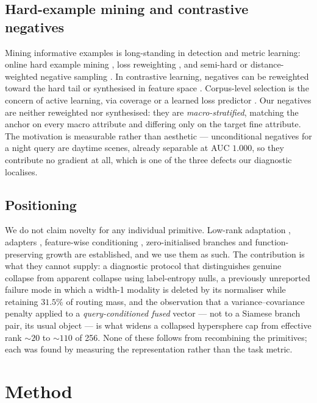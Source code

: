 \documentclass[10pt,twocolumn,letterpaper]{article}
\begin{document}
\subsection{Hard-example mining and contrastive negatives}
Mining informative examples is long-standing in detection and metric
learning: online hard example mining \cite{ohem}, loss reweighting
\cite{focal}, and semi-hard or distance-weighted negative sampling
\cite{facenet,samplingmatters}. In contrastive learning, negatives can be
reweighted toward the hard tail \cite{hardneg} or synthesised in feature
space \cite{mochi}. Corpus-level selection is the concern of active
learning, via coverage \cite{coreset} or a learned loss predictor \cite{learningloss}. Our
negatives are neither reweighted nor synthesised: they are
\emph{macro-stratified}, matching the anchor on every macro attribute and
differing only on the target fine attribute. The motivation is measurable
rather than aesthetic --- unconditional negatives for a night query are
daytime scenes, already separable at AUC $1.000$, so they contribute no
gradient at all, which is one of the three defects our diagnostic
localises.

\subsection{Positioning}
We do not claim novelty for any individual primitive. Low-rank adaptation
\cite{lora,qlora}, adapters \cite{adapters,prefix,vpt}, feature-wise
conditioning \cite{film}, zero-initialised branches \cite{controlnet} and
function-preserving growth \cite{net2net} are established, and we use them
as such. The contribution is what they cannot supply: a diagnostic protocol
that distinguishes genuine collapse from apparent collapse using
label-entropy nulls, a previously unreported failure mode in which a
width-1 modality is deleted by its normaliser while retaining $31.5\%$ of
routing mass, and the observation that a variance--covariance penalty
\cite{vicreg} applied to a \emph{query-conditioned fused} vector --- not to
a Siamese branch pair, its usual object --- is what widens a collapsed
hypersphere cap from effective rank ${\sim}20$ to ${\sim}110$ of 256. None
of these follows from recombining the primitives; each was found by
measuring the representation rather than the task metric.

\section{Method}
\label{sec:method}
\end{document}

